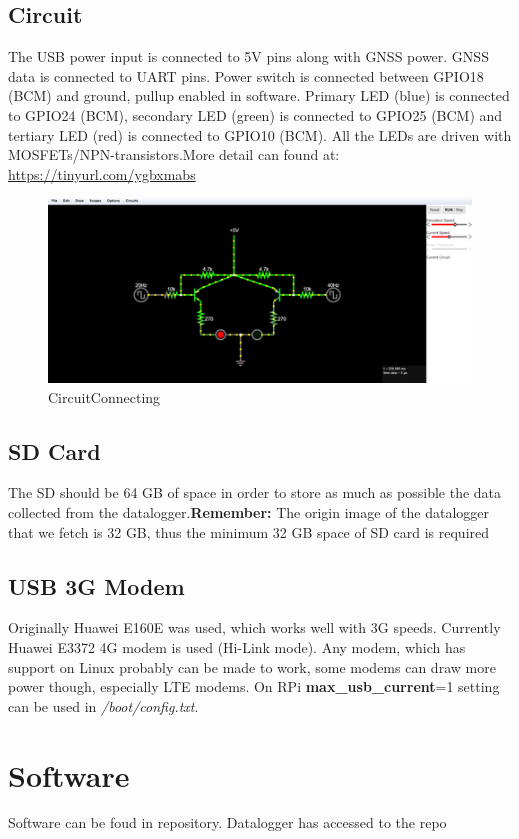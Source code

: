 \documentclass{report}
\begin{document}
\subsection{Circuit}
The USB power input is connected to 5V pins along with GNSS power. GNSS data is connected to UART pins. Power switch is connected between GPIO18 (BCM) and ground, pullup enabled in software. Primary LED (blue) is connected to GPIO24 (BCM), secondary LED (green) is connected to GPIO25 (BCM) and tertiary LED (red) is connected to GPIO10 (BCM). All the LEDs are driven with MOSFETs/NPN-transistors.More detail can found at: \url{https://tinyurl.com/ygbxmabs} 
\begin{figure}[H]
    \centering
    \includegraphics[width=\textwidth]{CircuitConnecting.png}
    \caption{CircuitConnecting}
    \label{fig:my_label}
\end{figure}

\subsection{SD Card}
The SD should be 64 GB of space in order to store as much as possible the data collected from the datalogger.\textbf{Remember:} The origin image of the datalogger that we fetch is 32 GB, thus the minimum 32 GB space of SD card is required  
\subsection{USB 3G Modem}
Originally Huawei E160E was used, which works well with 3G speeds. Currently Huawei E3372 4G modem is used (Hi-Link mode). Any modem, which has support on Linux probably can be made to work, some modems can draw more power though, especially LTE modems. On RPi \textbf{max\_usb\_current}=1 setting can be used in \textit{/boot/config.txt}.
\section{Software}
Software can be foud in \url{} repository. Datalogger has accessed to the repo
\end{document}
